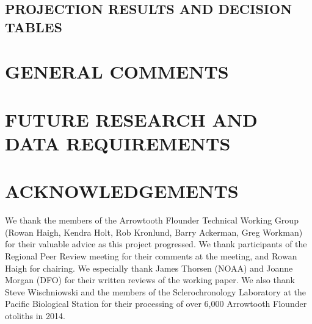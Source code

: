 \subsection{PROJECTION RESULTS AND DECISION TABLES}

\section{GENERAL COMMENTS}

\section{FUTURE RESEARCH AND DATA REQUIREMENTS}

\section{ACKNOWLEDGEMENTS}

We thank the members of the Arrowtooth Flounder Technical Working Group (Rowan Haigh, Kendra Holt, Rob Kronlund, Barry Ackerman, Greg Workman) for their valuable advice as this project progressed. We thank participants of the Regional Peer Review meeting for their comments at the meeting, and Rowan Haigh for chairing. We especially thank James Thorsen (NOAA) and Joanne Morgan (DFO) for their written reviews of the working paper. We also thank Steve Wischniowski and the members of the Sclerochronology Laboratory at the Pacific Biological Station for their processing of over 6,000 Arrowtooth Flounder otoliths in 2014.




\clearpage


